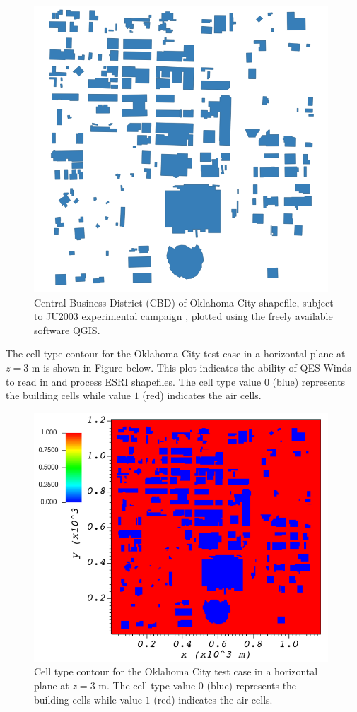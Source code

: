 \begin{figure}[H]
\centering
\includegraphics[width=11.0cm,keepaspectratio]{Images/OKC.png}
\caption{Central Business District (CBD) of Oklahoma City shapefile, subject to JU2003 experimental campaign \cite{allwine2006joint}, plotted using the freely available software QGIS.}
\end{figure}

The cell type contour for the Oklahoma City test case in a horizontal plane at $z=3$ m is shown in Figure below. This plot indicates the ability of QES-Winds to read in and process ESRI shapefiles. The cell type value $0$ (blue) represents the building cells while value $1$ (red) indicates the air cells.

\begin{figure}[H]
\centering
\includegraphics[width=11.0cm,keepaspectratio]{Images/oklahoma_z_3_icell.png}
\caption{Cell type contour for the Oklahoma City test case in a horizontal plane at $z=3$ m. The cell type value $0$ (blue) represents the building cells while value $1$ (red) indicates the air cells.}
\end{figure}

